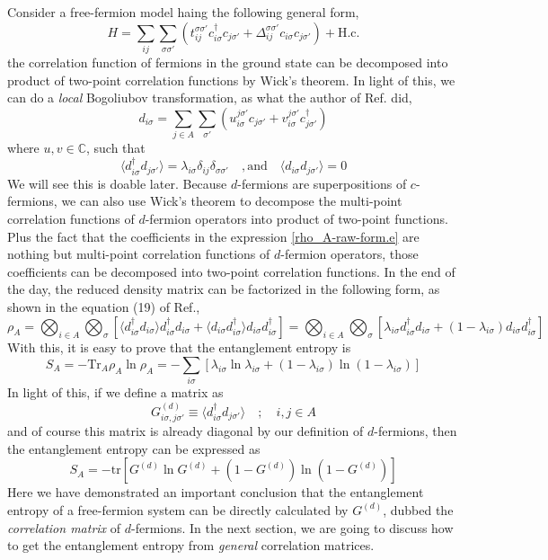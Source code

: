 \documentclass[12font]{article}
\theoremstyle{definition}
\numberwithin{equation}{section}
\newcommand{\anglelr}[1]{\langle #1 \rangle}
\newcommand{\llr}[1]{(  #1  )}
\newcommand{\lr}[1]{\left(  #1  \right)}
\newcommand{\lrm}[1]{\left[  #1  \right]}
\newcommand{\mrm}[1]{\mathrm{#1}}
\newcommand{\Tr}{\mrm{Tr}}
\newcommand{\tr}{\mrm{tr}}
\begin{document}
Consider a free-fermion model haing the following general form,
\[
H = \sum_{ij}\sum_{\sigma\sigma'}\lr{t_{ij}^{\sigma\sigma'} c_{i\sigma}^\dagger c_{j\sigma'} + \Delta_{ij}^{\sigma\sigma'}c_{i\sigma}c_{j\sigma'}} + \mrm{H.c.}
\]
the correlation function of fermions in the ground state can be decomposed into product of two-point correlation functions by Wick's theorem. In light of this, we can do a \emph{local} Bogoliubov transformation, as what the author of Ref.\cite{toeplitz} did, 
\[
d_{i\sigma} = \sum_{j\in A}\sum_{\sigma'}\lr{u^{j\sigma'}_{i\sigma}c_{j\sigma'} + v^{j\sigma'}_{i\sigma}c^\dagger_{j\sigma'}}
\]
where $u,v\in\mathbb{C}$, such that
\[
\anglelr{d^\dagger_{i\sigma} d_{j\sigma'}} = \lambda_{i\sigma}\delta_{ij}\delta_{\sigma\sigma'} \quad,\text{and}\quad \anglelr{d_{i\sigma}d_{j\sigma'}} = 0
\]
We will see this is doable later. Because $d$-fermions are superpositions of $c$-fermions, we can also use Wick's theorem to decompose the multi-point correlation functions of $d$-fermion operators into product of two-point functions. Plus the fact that the coefficients in the expression \ref{rho_A-raw-form.e} are nothing but multi-point correlation functions of $d$-fermion operators, those coefficients can be decomposed into two-point correlation functions. In the end of the day, the reduced density matrix can be factorized in the following form, as shown in the equation (19) of Ref.\cite{toeplitz},
\begin{equation}\label{rho_A-factorize.e}
\rho_A = \bigotimes_{i\in A}\bigotimes_{\sigma}\lrm{\anglelr{d^\dagger_{i\sigma}d_{i\sigma}} d^\dagger_{i\sigma}d_{i\sigma} + \anglelr{d_{i\sigma}d^\dagger_{i\sigma}}d_{i\sigma}d^\dagger_{i\sigma}} = \bigotimes_{i\in A}\bigotimes_{\sigma}\lrm{\lambda_{i\sigma}d^\dagger_{i\sigma}d_{i\sigma} + \llr{1-\lambda_{i\sigma}}d_{i\sigma}d^\dagger_{i\sigma}}
\end{equation}
With this, it is easy to prove that the entanglement entropy is
\[
S_A = -\Tr_A\rho_A\ln\rho_A = -\sum_{i\sigma}\lrm{\lambda_{i\sigma}\ln\lambda_{i\sigma} + \llr{1-\lambda_{i\sigma}}\ln\llr{1-\lambda_{i\sigma}}}
\]
In light of this, if we define a matrix as
\begin{equation}\label{b-corrmatrix-def.e}
  G^{(d)}_{i\sigma,j\sigma'} \equiv \anglelr{d^\dagger_{i\sigma}d_{j\sigma'}} \quad;\quad i,j\in A
\end{equation}
and of course this matrix is already diagonal by our definition of $d$-fermions, then the entanglement entropy can be expressed as
\begin{equation}\label{ee-matrixexpression-1.e}
  S_A = -\tr\lrm{G^{(d)}\ln G^{(d)} + \llr{\mathrm{1} - G^{(d)}}\ln\llr{\mathrm{1}-G^{(d)}}}
\end{equation}
Here we have demonstrated an important conclusion that the entanglement entropy of a free-fermion system can be directly calculated by $G^{(d)}$, dubbed the \emph{correlation matrix} of $d$-fermions. In the next section, we are going to discuss how to get the entanglement entropy from \emph{general} correlation matrices.
\end{document}
